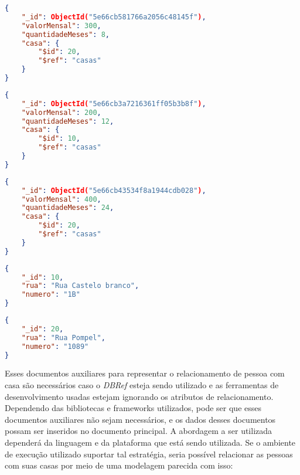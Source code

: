 \newpage

\begin{lstlisting}[language=json, caption={Documento do Relacionamento da Pessoa \textit{Eduardo} Com Sua Casa}]
{
    "_id": ObjectId("5e66cb581766a2056c48145f"),
    "valorMensal": 300,
    "quantidadeMeses": 8,
    "casa": {
        "$id": 20,
        "$ref": "casas"
    }
}
\end{lstlisting}

\begin{lstlisting}[language=json, caption={Documento do Relacionamento da Pessoa \textit{Emanuel} Com Sua Primeira Casa}]
{
    "_id": ObjectId("5e66cb3a7216361ff05b3b8f"),
    "valorMensal": 200,
    "quantidadeMeses": 12,
    "casa": {
        "$id": 10,
        "$ref": "casas"
    }
}
\end{lstlisting}

\begin{lstlisting}[language=json, caption={Documento do Relacionamento da Pessoa \textit{Emanuel} Com Sua Segunda Casa}]
{
    "_id": ObjectId("5e66cb43534f8a1944cdb028"),
    "valorMensal": 400,
    "quantidadeMeses": 24,
    "casa": {
        "$id": 20,
        "$ref": "casas"
    }
}
\end{lstlisting}

\newpage

\begin{lstlisting}[language=json, caption={Documento da Casa de Número 1B}]
{
    "_id": 10,
    "rua": "Rua Castelo branco",
    "numero": "1B"
}
\end{lstlisting}

\begin{lstlisting}[language=json, caption={Documento da Casa de Número 1089}]
{
    "_id": 20,
    "rua": "Rua Pompel",
    "numero": "1089"
}
\end{lstlisting}

Esses documentos auxiliares para representar o relacionamento de pessoa com casa são necessários caso o \textit{DBRef} esteja sendo utilizado e as ferramentas de desenvolvimento usadas estejam ignorando os atributos de relacionamento. Dependendo das bibliotecas e frameworks utilizados, pode ser que esses documentos auxiliares não sejam necessários, e os dados desses documentos possam ser inseridos no documento principal. A abordagem a ser utilizada dependerá da linguagem e da plataforma que está sendo utilizada. Se o ambiente de execução utilizado suportar tal estratégia, seria possível relacionar as pessoas com suas casas por meio de uma modelagem parecida com isso:


